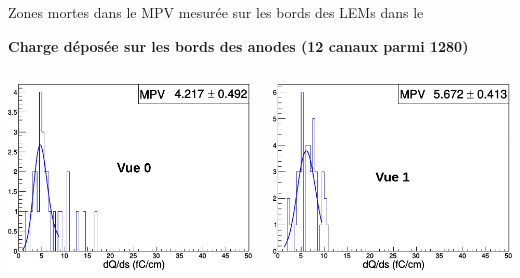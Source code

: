     \begin{frame}{Zones mortes dans le \TOO{}}{MPV mesurée sur les bords des LEMs dans le \TOO{}}
        \begin{scriptsize}
            \centering \textbf{Charge déposée sur les bords des anodes (12 canaux parmi 1280)}
            \begin{columns}
                \begin{column}{0.5\textwidth}
                    \includegraphics[width=\textwidth]{./pictures/dQds_840_0_border.pdf}
                \end{column}
                \begin{column}{0.5\textwidth}
                    \includegraphics[width=\textwidth]{./pictures/dQds_840_1_border.pdf}

\end{column}
\end{columns}
\end{scriptsize}
\end{frame}
